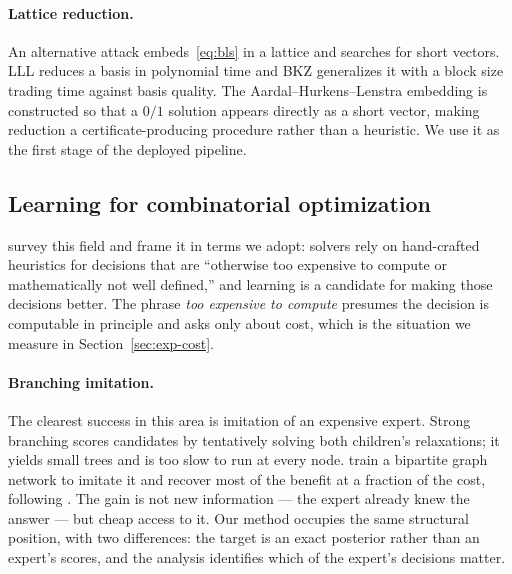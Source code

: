 \documentclass[11pt]{article}
\begin{document}
\paragraph{Lattice reduction.} An alternative attack embeds~\eqref{eq:bls} in a lattice and searches for short vectors. LLL \citep{lenstra1982factoring} reduces a basis in polynomial time and BKZ \citep{schnorr1994lattice} generalizes it with a block size trading time against basis quality. The Aardal--Hurkens--Lenstra embedding \citep{aardal2000diophantine, aardal2000market} is constructed so that a $0/1$ solution appears directly as a short vector, making reduction a certificate-producing procedure rather than a heuristic. We use it as the first stage of the deployed pipeline.

\subsection{Learning for combinatorial optimization}

\citet{bengio2021machine} survey this field and frame it in terms we adopt: solvers rely on hand-crafted heuristics for decisions that are ``otherwise too expensive to compute or mathematically not well defined,'' and learning is a candidate for making those decisions better. The phrase \emph{too expensive to compute} presumes the decision is computable in principle and asks only about cost, which is the situation we measure in Section~\ref{sec:exp-cost}.

\paragraph{Branching imitation.} The clearest success in this area is imitation of an expensive expert. Strong branching scores candidates by tentatively solving both children's relaxations; it yields small trees and is too slow to run at every node. \citet{gasse2019exact} train a bipartite graph network to imitate it and recover most of the benefit at a fraction of the cost, following \citet{khalil2016learning}. The gain is not new information --- the expert already knew the answer --- but cheap access to it. Our method occupies the same structural position, with two differences: the target is an exact posterior rather than an expert's scores, and the analysis identifies which of the expert's decisions matter.
\end{document}
